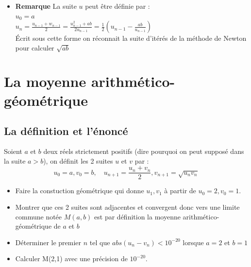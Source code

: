 \documentclass[a4paper,11pt]{book}
\begin{document}
\begin{itemize}
et \`a partir de ligne 5 les colonnes {\tt A} et {\tt B} valent :
{\tt [[1.414213562373095048803]]}\\
On tape : avec 21 chiffres apr\`es la virgule {\tt sqrt(2.)}\\
On obtient : {\tt 1.414213562373095048801}
\item {\bf Remarque}
La suite $u$ peut \^etre d\'efinie par :\\
$u_0=a$\\
$\displaystyle u_n=\frac{u_{n-1}+w_{n-1}}{2}=\frac{u_{n-1}^2+ab}{2u_{n-1}}=\frac{1}{2}(u_{n-1}-\frac{ab}{u_{n-1}})$\\
\'Ecrit sous cette forme on r\'econnait la suite d'it\'er\'es de la m\'ethode 
de Newton pour calculer $\sqrt{ab}$
\end{itemize}

\section{La moyenne arithm\'etico-g\'eom\'etrique}
\subsection{La d\'efinition et l'\'enonc\'e}
Soient $a$ et $b$ deux r\'eels strictement positifs (dire pourquoi on peut 
suppos\'e dans la suite $a>b$), on d\'efinit les 2 suites $u$ et $v$ par :
\begin{equation} \label{eq:agm}
 u_0=a, v_0=b, \quad u_{n+1}=\frac{u_n+v_n}{2}, v_{n+1}=\sqrt{u_nv_n} 
\end{equation}
\begin{itemize}
\item Faire la constuction g\'eom\'etrique qui donne $u_1, v_1$ \`a partir de
$u_0=2, v_0=1$.\\
\item Montrer que ces 2 suites sont adjacentes et convergent donc vers
une limite commune not\'ee $M(a,b)$ est par d\'efinition la moyenne 
arithm\'etico-g\'eom\'etrique de $a$ et $b$\\
\item D\'eterminer le premier $n$ tel que $abs(u_n-v_n)<10^{-20}$ lorsque $a=2$
et $b=1$
\item Calculer M(2,1) avec une pr\'ecision de $10^{-20}$.
\end{itemize}
\end{document}
